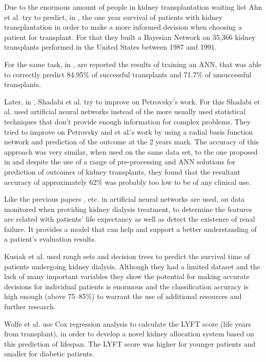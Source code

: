 Due to the enormous amount of people in kidney transplantation waiting list Ahn et al. try to predict, in \cite{Ahn2000}, the 
one year survival of patients with kidney transplantation in order to make a more informed decision when choosing a patient for 
transplant. For that they built a Bayesian Network on 35,366 kidney transplants performed in the United States between 1987 and 1991.

For the same task, in \cite{Petrovsky2002}, are reported the results of training an ANN, that was able to correctly predict 84.95\% 
of successful transplants and 71.7\% of unsuccessful transplants.

Later, in \cite{Shadabi2004}, Shadabi et al. try to improve on Petrovsky’s work. For this Shadabi et al. used
 artificial neural networks instead of the more usually used statistical techniques that don’t provide enough information for complex
 problems. They tried to improve on Petrovsky and et al.’s work by using a radial basis function network and prediction of the outcome
 at the 2 years mark. The accuracy of this approach was very similar, when used on the same data set, to the one proposed in 
 \cite{Petrovsky2002} and despite the use of a range of pre-processing and ANN solutions for prediction of outcomes of 
 kidney transplants, they found that the resultant accuracy of approximately 62\% was probably too low to be of any clinical use. 

Like the previous papers \cite{Shadabi2004}, etc. in \cite{Osofisan2011} artificial 
neural networks are used, on data monitored when providing kidney dialysis treatment, to determine the features are related with
 patients’ life expectancy as well as detect the existence of renal failure. It provides a model that can help and support a better 
 understanding of a patient’s evaluation results.

Kusiak et al. \cite{Kusiak2005} used rough sets and decision trees to predict the survival time of patients undergoing
 kidney dialysis. Although they had a limited dataset and the lack of many important variables they show the potential for making 
 accurate decisions for individual patients is enormous and the classification accuracy is high enough (above 75–85\%) to warrant the
 use of additional resources and further research.

Wolfe et al. \cite{Wolfe2008} use Cox regression analysis to calculate the LYFT score (life years from transplant), in order
 to develop a novel kidney allocation system based on this prediction of lifespan. The LYFT score was higher for younger patients and 
 smaller for diabetic patients.

